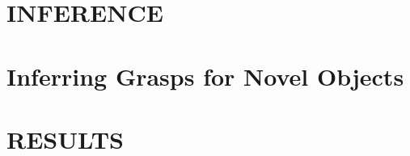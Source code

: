 \documentclass[a4paper, 10pt, conference]{ieeeconf}
\begin{document}
\section{INFERENCE}
\label{sec:infer}


\section{Inferring Grasps for Novel Objects}
\label{sec:infernovel}


\section{RESULTS}
\label{sec:results}


 




\addtolength{\textheight}{-12cm}

%
%
\end{document}
